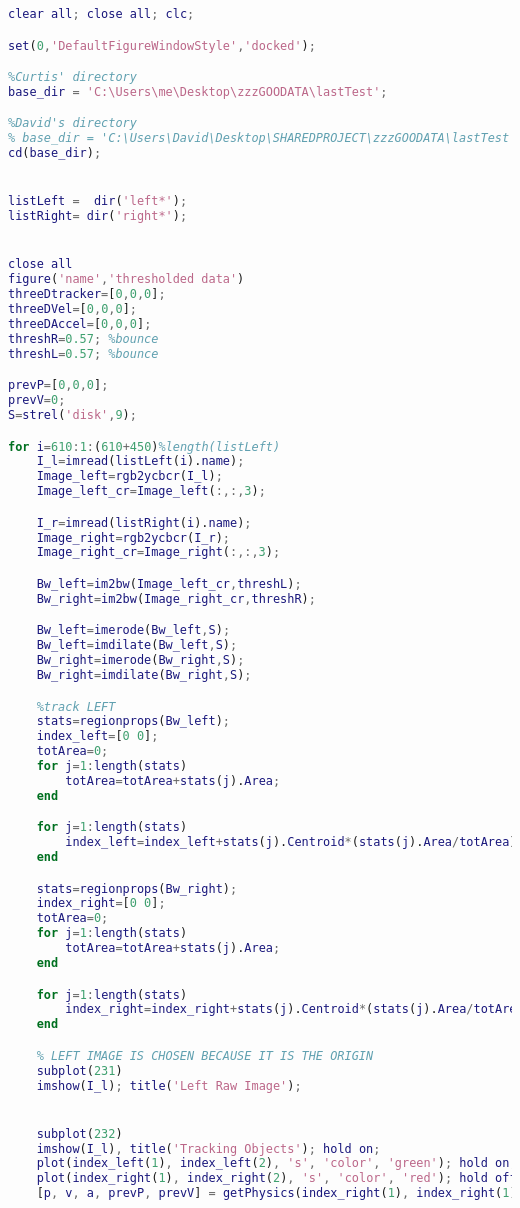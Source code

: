 \documentclass{IEEEtran}
\begin{document}
\begin{lstlisting}[caption={MATLAB Ball Hold Tracking Demo},label={lst:ballHoldDemo},language=MATLAB]
clear all; close all; clc;

set(0,'DefaultFigureWindowStyle','docked');

%Curtis' directory
base_dir = 'C:\Users\me\Desktop\zzzGOODATA\lastTest';

%David's directory
% base_dir = 'C:\Users\David\Desktop\SHAREDPROJECT\zzzGOODATA\lastTest';
cd(base_dir);


listLeft =  dir('left*');
listRight= dir('right*');


close all
figure('name','thresholded data')
threeDtracker=[0,0,0];
threeDVel=[0,0,0];
threeDAccel=[0,0,0];
threshR=0.57; %bounce 
threshL=0.57; %bounce

prevP=[0,0,0];
prevV=0;
S=strel('disk',9);

for i=610:1:(610+450)%length(listLeft)
    I_l=imread(listLeft(i).name);
    Image_left=rgb2ycbcr(I_l);
    Image_left_cr=Image_left(:,:,3);

    I_r=imread(listRight(i).name);
    Image_right=rgb2ycbcr(I_r);
    Image_right_cr=Image_right(:,:,3);

    Bw_left=im2bw(Image_left_cr,threshL);
    Bw_right=im2bw(Image_right_cr,threshR);

    Bw_left=imerode(Bw_left,S);
    Bw_left=imdilate(Bw_left,S);
    Bw_right=imerode(Bw_right,S);
    Bw_right=imdilate(Bw_right,S);

    %track LEFT
    stats=regionprops(Bw_left);
    index_left=[0 0];
    totArea=0;
    for j=1:length(stats)
        totArea=totArea+stats(j).Area;
    end

    for j=1:length(stats)
        index_left=index_left+stats(j).Centroid*(stats(j).Area/totArea);
    end

    stats=regionprops(Bw_right);
    index_right=[0 0];
    totArea=0;
    for j=1:length(stats)
        totArea=totArea+stats(j).Area;
    end

    for j=1:length(stats)
        index_right=index_right+stats(j).Centroid*(stats(j).Area/totArea);
    end

    % LEFT IMAGE IS CHOSEN BECAUSE IT IS THE ORIGIN
    subplot(231)
    imshow(I_l); title('Left Raw Image');


    subplot(232)
    imshow(I_l), title('Tracking Objects'); hold on;
    plot(index_left(1), index_left(2), 's', 'color', 'green'); hold on;
    plot(index_right(1), index_right(2), 's', 'color', 'red'); hold off;
    [p, v, a, prevP, prevV] = getPhysics(index_right(1), index_right(1),index_left(1),index_left(2),prevP,prevV);


\end{lstlisting}
\end{document}
